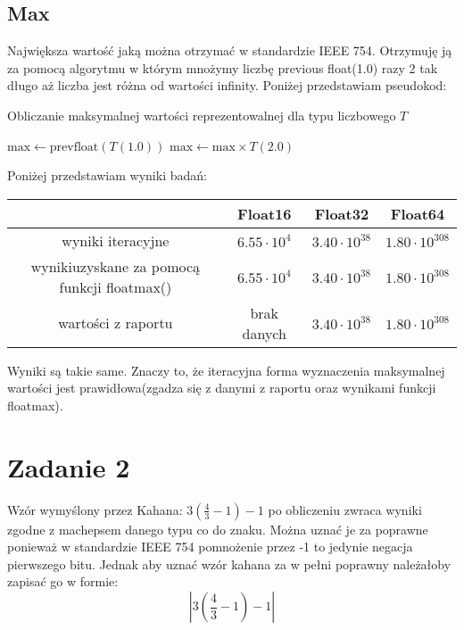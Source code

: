 \documentclass{article}
\begin{document}
\subsection*{Max}
Największa wartość jaką można otrzymać w standardzie IEEE 754. Otrzymuję ją za pomocą algorytmu w którym mnożymy liczbę previous float(1.0) razy 2 tak długo aż liczba jest różna od wartości infinity. Poniżej przedstawiam pseudokod:

\begin{algorithm}
\caption{Obliczanie maksymalnej wartości reprezentowalnej dla typu liczbowego \( T \)}
\begin{algorithmic}[1]
    \State \( \text{max} \gets \text{prevfloat}(T(1.0)) \) 
        \State \( \text{max} \gets \text{max} \times T(2.0) \) 
    \EndWhile
    \State \Return {} 
\EndFunction
\end{algorithmic}
\end{algorithm}
Poniżej przedstawiam wyniki badań:

\begin{center}
  \begin{tabular}{|c|c|c|c|}
    \hline
       & Float16           & Float32              & Float64               \\ [0.5ex]
    \hline
    wyniki iteracyjne  & $6.55 \cdot 10^4$ & $3.40 \cdot 10^{38}$ & $1.80 \cdot 10^{308}$ \\
    \hline
    wynikiuzyskane za pomocą funkcji floatmax() & $6.55 \cdot 10^4$ & $3.40 \cdot 10^{38}$ & $1.80 \cdot 10^{308}$ \\
    \hline
    wartości z raportu  & brak danych   & $3.40 \cdot 10^{38}$ & $1.80 \cdot 10^{308}$ \\
    \hline
  \end{tabular}
\end{center}
Wyniki są takie same. Znaczy to, że iteracyjna forma wyznaczenia maksymalnej wartości jest prawidłowa(zgadza się z danymi z raportu oraz wynikami funkcji floatmax).




\section*{Zadanie 2}
Wzór wymyślony przez Kahana: $3(\frac{4}{3}-1)-1$ po obliczeniu zwraca wyniki zgodne z machepsem danego typu co do znaku. Można uznać je za poprawne ponieważ w standardzie IEEE 754 pomnożenie przez -1 to jedynie negacja pierwszego bitu. Jednak aby uznać wzór kahana za w pełni poprawny należałoby zapisać go w formie:
\[
\left| 3 \left( \frac{4}{3} - 1 \right) - 1 \right|
\]
\end{document}
